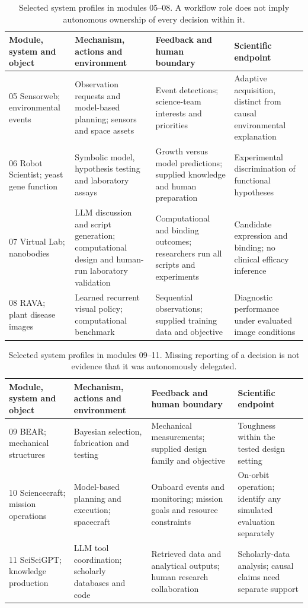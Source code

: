 \begin{table}[H]
\caption{Selected system profiles in modules 05--08. A workflow role does not imply autonomous ownership of every decision within it.}
\label{tab:representatives-b}
\scriptsize
\begin{tabularx}{\textwidth}{@{}p{}XXX@{}}
\toprule
Module, system and object & Mechanism, actions and environment & Feedback and human boundary & Scientific endpoint \\
\midrule
05 Sensorweb; environmental events~\cite{asd0722} & Observation requests and model-based planning; sensors and space assets & Event detections; science-team interests and priorities & Adaptive acquisition, distinct from causal environmental explanation \\
06 Robot Scientist; yeast gene function~\cite{king2004} & Symbolic model, hypothesis testing and laboratory assays & Growth versus model predictions; supplied knowledge and human preparation & Experimental discrimination of functional hypotheses \\
07 Virtual Lab; nanobodies~\cite{asd0054} & LLM discussion and script generation; computational design and human-run laboratory validation & Computational and binding outcomes; researchers run all scripts and experiments & Candidate expression and binding; no clinical efficacy inference \\
08 RAVA; plant disease images~\cite{asd1133} & Learned recurrent visual policy; computational benchmark & Sequential observations; supplied training data and objective & Diagnostic performance under evaluated image conditions \\
\bottomrule
\end{tabularx}
\end{table}

\begin{table}[H]
\caption{Selected system profiles in modules 09--11. Missing reporting of a decision is not evidence that it was autonomously delegated.}
\label{tab:representatives-c}
\scriptsize
\begin{tabularx}{\textwidth}{@{}p{}XXX@{}}
\toprule
Module, system and object & Mechanism, actions and environment & Feedback and human boundary & Scientific endpoint \\
\midrule
09 BEAR; mechanical structures~\cite{asd0504} & Bayesian selection, fabrication and testing & Mechanical measurements; supplied design family and objective & Toughness within the tested design setting \\
10 Sciencecraft; mission operations~\cite{asd0645} & Model-based planning and execution; spacecraft & Onboard events and monitoring; mission goals and resource constraints & On-orbit operation; identify any simulated evaluation separately \\
11 SciSciGPT; knowledge production~\cite{asd0624} & LLM tool coordination; scholarly databases and code & Retrieved data and analytical outputs; human research collaboration & Scholarly-data analysis; causal claims need separate support \\
\bottomrule
\end{tabularx}
\end{table}
